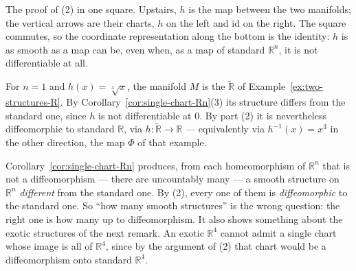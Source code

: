 \documentclass[11pt]{report}
\makeatletter
\newcounter{excounter}[section]
\newcommand{\exlabel}[1]{\edef\@currentlabel{\arabic{section}.\arabic{excounter}}\label{#1}}
\newcommand{\leeref}[1]{\par\smallskip{\raggedleft\footnotesize\textsc{Lee}:\ #1\par}}
\makeatother
\begin{document}
\begin{center}
\end{center}

The proof of (2) in one square. Upstairs, $h$ is the map between the two manifolds; the vertical arrows are their charts, $h$ on the left and $\mathrm{id}$ on the right. The square commutes, so the coordinate representation along the bottom is the identity: $h$ is as smooth as a map can be, even when, as a map of standard $\mathbb{R}^n$, it is not differentiable at all.

\begin{exbox}\exlabel{ex:cube-root-transport}
For $n = 1$ and $h(x) = \sqrt[3]{x}$, the manifold $M$ is the $\widetilde{\mathbb{R}}$ of Example~\ref{ex:two-structures-R}. By Corollary~\ref{cor:single-chart-Rn}(3) its structure differs from the standard one, since $h$ is not differentiable at $0$. By part (2) it is nevertheless diffeomorphic to standard $\mathbb{R}$, via $h : \widetilde{\mathbb{R}} \to \mathbb{R}$ --- equivalently via $h^{-1}(x) = x^3$ in the other direction, the map $\Phi$ of that example.
\leeref{Example 1.23}
\end{exbox}

\begin{rembox}\label{rem:smooth-structures-13}
Corollary~\ref{cor:single-chart-Rn} produces, from each homeomorphism of $\mathbb{R}^n$ that is not a diffeomorphism --- there are uncountably many --- a smooth structure on $\mathbb{R}^n$ \emph{different} from the standard one. By (2), every one of them is \emph{diffeomorphic} to the standard one. So ``how many smooth structures'' is the wrong question: the right one is how many up to diffeomorphism. It also shows something about the exotic structures of the next remark. An exotic $\mathbb{R}^4$ cannot admit a single chart whose image is all of $\mathbb{R}^4$, since by the argument of (2) that chart would be a diffeomorphism onto standard $\mathbb{R}^4$.
\end{rembox}
\end{document}
